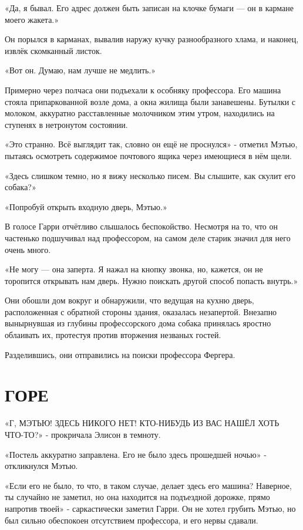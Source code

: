 \documentclass[a5paper, 9pt,
final, openany, twoside=true]{memoir}
\begin{document}
«Да, я бывал. Его адрес должен быть записан на клочке бумаги — он в кармане моего жакета.»

Он порылся в карманах, вывалив наружу кучку разнообразного хлама, и наконец, извлёк скомканный листок.

«Вот он. Думаю, нам лучше не медлить.»\bigskip
	
Примерно через полчаса они подъехали к особняку профессора. Его машина стояла припаркованной возле дома, а окна жилища были занавешены. Бутылки с молоком, аккуратно расставленные молочником этим утром, находились на ступенях в нетронутом состоянии.

«Это странно. Всё выглядит так, словно он ещё не проснулся» - отметил Мэтью, пытаясь осмотреть содержимое почтового ящика через имеющиеся в нём щели.

«Здесь слишком темно, но я вижу несколько писем. Вы слышите, как скулит его собака?»

«Попробуй открыть входную дверь, Мэтью.»

В голосе Гарри отчётливо слышалось беспокойство. Несмотря на то, что он частенько подшучивал над профессором, на самом деле старик значил для него очень много.

«Не могу — она заперта. Я нажал на кнопку звонка, но, кажется, он не торопится открывать нам дверь. Нужно поискать другой способ попасть внутрь.»

Они обошли дом вокруг и обнаружили, что ведущая на кухню дверь, расположенная с обратной стороны здания, оказалась незапертой. Внезапно вынырнувшая из глубины профессорского дома собака принялась яростно облаивать их, протестуя против вторжения незваных гостей.

Разделившись, они отправились на поиски профессора Фергера.
\chapter{ГОРЕ}
«Г{, МЭТЬЮ! ЗДЕСЬ НИКОГО НЕТ!  КТО-НИБУДЬ ИЗ ВАС НАШЁЛ ХОТЬ ЧТО-ТО?}» - прокричала Элисон в темноту.

«Постель аккуратно заправлена. Его не было здесь прошедшей ночью» - откликнулся Мэтью.

«Если его не было, то что, в таком случае, делает здесь его машина? Наверное, ты случайно не заметил, но она находится на подъездной дорожке, прямо напротив твоей» - саркастически заметил Гарри. Он не хотел грубить Мэтью, но был сильно обеспокоен отсутствием профессора, и его нервы сдавали.
\end{document}
